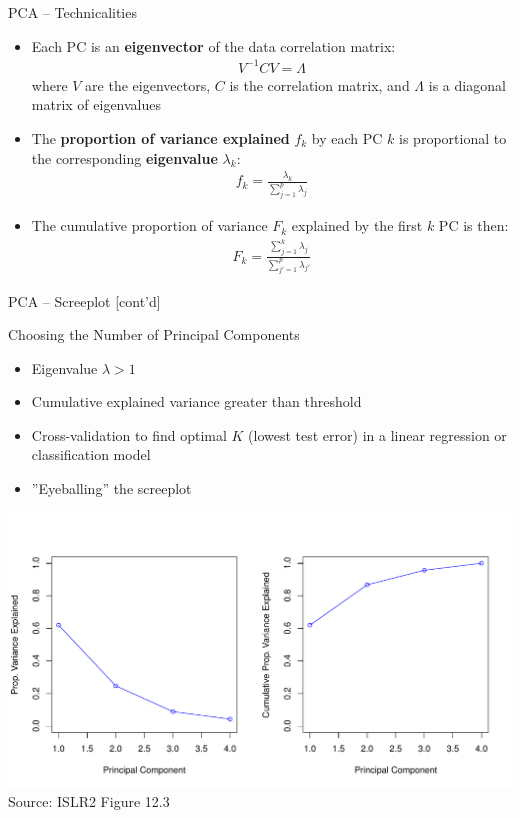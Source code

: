 \documentclass[ignorenonframetext,xcolor=x11names]{beamer}
\begin{document}
\begin{frame}{PCA -- Technicalities}
\begin{itemize}
  \item Each PC is an \textbf{eigenvector} of the data correlation matrix:
\begin{align*}
V^{-1}CV = \Lambda
\end{align*}
 where $V$ are the eigenvectors, $C$ is the correlation matrix, and $\Lambda$ is a diagonal matrix of eigenvalues
\end{itemize}
\begin{itemize}
  \item The \textbf{proportion of variance explained} $f_k$ by each PC $k$ is proportional to the corresponding \textbf{eigenvalue} $\lambda_k$:
\begin{align*}
f_k = \frac{\lambda_k}{\sum_{j=1}^p \lambda_{j}} 
\end{align*}
  \item The cumulative proportion of variance $F_k$ explained by the first $k$ PC is then:
\begin{align*}
F_k = \frac{\sum_{j=1}^k \lambda_j}{\sum_{j'=1}^p \lambda_{j'}}
\end{align*}
\end{itemize}
\end{frame}

\begin{frame}{PCA -- Screeplot \small [cont'd]}
\begin{block}{Choosing the Number of Principal Components}
\small
\begin{itemize}
   \item Eigenvalue $\lambda > 1$
   \item Cumulative explained variance greater than threshold
   \item Cross-validation to find optimal $K$ (lowest test error) in a linear regression or classification model
   \item ''Eyeballing'' the screeplot
\end{itemize}
\end{block}
\centering
\includegraphics[width=.8\textwidth]{../class11/Figures_Chapters_7-13/Chapter12/12_3.pdf} \\

\scriptsize Source: ISLR2 Figure 12.3
\end{frame}
\end{document}
